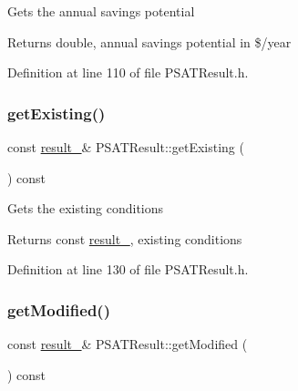 Gets the annual savings potential

\begin{DoxyReturn}{Returns}
double, annual savings potential in \$/year 
\end{DoxyReturn}


Definition at line 110 of file P\+S\+A\+T\+Result.\+h.

\mbox{\label{class_p_s_a_t_result_a4da660959f368bdf0951728c9c5f931b}} 
\subsubsection{\texorpdfstring{get\+Existing()}{getExisting()}}
{\footnotesize\ttfamily const \hyperlink{struct_p_s_a_t_result_1_1result__}{result\+\_\+}\& P\+S\+A\+T\+Result\+::get\+Existing (\begin{DoxyParamCaption}{ }\end{DoxyParamCaption}) const\hspace{0.3cm}{\ttfamily [inline]}}

Gets the existing conditions

\begin{DoxyReturn}{Returns}
const \hyperlink{struct_p_s_a_t_result_1_1result__}{result\+\_\+}, existing conditions 
\end{DoxyReturn}


Definition at line 130 of file P\+S\+A\+T\+Result.\+h.

\mbox{\label{class_p_s_a_t_result_ae43bb3b001e2746292d0dd0d6cebcfdd}} 
\subsubsection{\texorpdfstring{get\+Modified()}{getModified()}}
{\footnotesize\ttfamily const \hyperlink{struct_p_s_a_t_result_1_1result__}{result\+\_\+}\& P\+S\+A\+T\+Result\+::get\+Modified (\begin{DoxyParamCaption}{ }\end{DoxyParamCaption}) const\hspace{0.3cm}{\ttfamily [inline]}}

